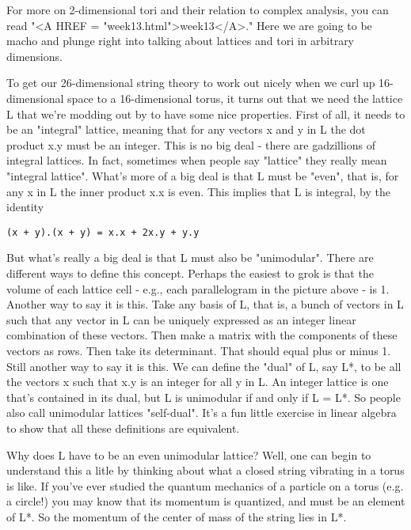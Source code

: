 For more on 2-dimensional tori and their relation to complex analysis,
you can read "<A HREF = "week13.html">week13</A>."  Here we are going to be macho and plunge right
into talking about lattices and tori in arbitrary dimensions.  

To get our 26-dimensional string theory to work out nicely when we
curl up 16-dimensional space to a 16-dimensional torus, it turns
out that we need the lattice L that we're modding out by to have some
nice properties.  First of all, it needs to be an "integral" lattice,
meaning that for any vectors x and y in L the dot product x.y must
be an integer.  This is no big deal - there are gadzillions of
integral lattices.  In fact, sometimes when people say "lattice" they 
really mean "integral lattice".  What's more of a big deal is that 
L must be "even", that is, for any x in L the inner product x.x is 
even.  This implies that L is integral, by the identity

\begin{verbatim}
(x + y).(x + y) = x.x + 2x.y + y.y
\end{verbatim}
    
But what's really a big deal is that L must also be "unimodular".
There are different ways to define this concept.  Perhaps the easiest 
to grok is that the volume of each lattice cell - e.g., each 
parallelogram in the picture above - is 1.  Another way to say it 
is this.  Take any basis of L, that is, a bunch of vectors in L
such that any vector in L can be uniquely expressed as an integer
linear combination of these vectors.  Then make a matrix with the 
components of these vectors as rows.  Then take its determinant.  
That should equal plus or minus 1.  Still another way to say it
is this.  We can define the "dual" of L, say L*, to be all the 
vectors x such that x.y is an integer for all y in L.  An integer
lattice is one that's contained in its dual, but L is unimodular if 
and only if L = L*.   So people also call unimodular lattices 
"self-dual".  It's a fun little exercise in linear algebra to show 
that all these definitions are equivalent.  

Why does L have to be an even unimodular lattice?  Well, one
can begin to understand this a litle by thinking about what a closed 
string vibrating in a torus is like.   If you've ever studied the 
quantum mechanics of a particle on a torus (e.g. a circle!) you may 
know that its momentum is quantized, and must be an element of L*.  So 
the momentum of the center of mass of the string lies in L*.  

